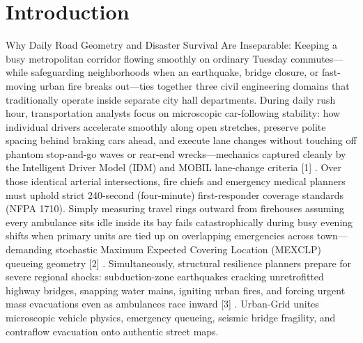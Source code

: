 \documentclass[10pt,letterpaper]{article}
\begin{document}
\section{Introduction}
Why Daily Road Geometry and Disaster Survival Are Inseparable: Keeping a busy metropolitan corridor flowing smoothly on ordinary Tuesday commutes---while safeguarding neighborhoods when an earthquake, bridge closure, or fast-moving urban fire breaks out---ties together three civil engineering domains that traditionally operate inside separate city hall departments. During daily rush hour, transportation analysts focus on microscopic car-following stability: how individual drivers accelerate smoothly along open stretches, preserve polite spacing behind braking cars ahead, and execute lane changes without touching off phantom stop-and-go waves or rear-end wrecks---mechanics captured cleanly by the Intelligent Driver Model (IDM) and MOBIL lane-change criteria [1] . Over those identical arterial intersections, fire chiefs and emergency medical planners must uphold strict 240-second (four-minute) first-responder coverage standards (NFPA 1710). Simply measuring travel rings outward from firehouses assuming every ambulance sits idle inside its bay fails catastrophically during busy evening shifts when primary units are tied up on overlapping emergencies across town---demanding stochastic Maximum Expected Covering Location (MEXCLP) queueing geometry [2] . Simultaneously, structural resilience planners prepare for severe regional shocks: subduction-zone earthquakes cracking unretrofitted highway bridges, snapping water mains, igniting urban fires, and forcing urgent mass evacuations even as ambulances race inward [3] . Urban-Grid unites microscopic vehicle physics, emergency queueing, seismic bridge fragility, and contraflow evacuation onto authentic street maps.
\end{document}
